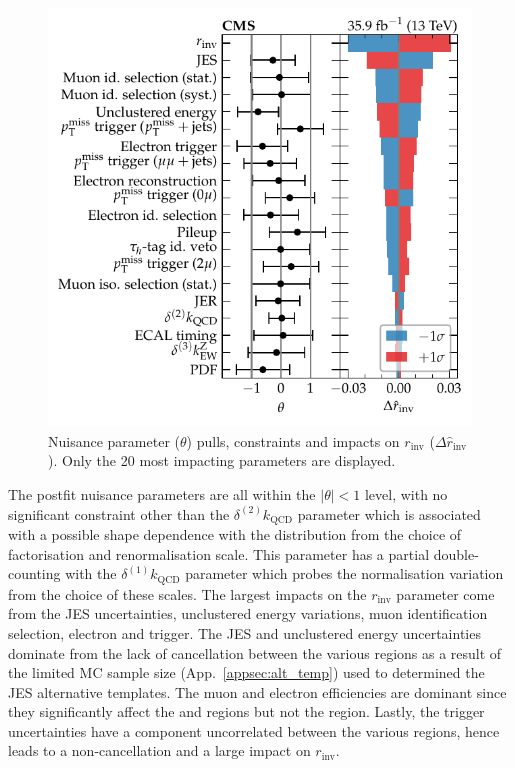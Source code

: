 \begin{figure}
    \centering
    \includegraphics{chapters/043_results/images/finalfit-impacts.pdf}
    \caption[Nuisance parameters after a fit to the data between the signal and control regions.]{
        Nuisance parameter ($\theta$) pulls, constraints and impacts on $r_{\mathrm{inv}}$ ($\Delta \hat{r}_{\mathrm{inv}}$). Only the 20 most impacting parameters are displayed.
    }
    \label{fig:finalfit-impacts}
\end{figure}
%
The postfit nuisance parameters are all within the $|\theta|<1$ level, with no significant constraint other than the $\delta^{(2)}k_{\mathrm{QCD}}$ parameter which is associated with a possible shape dependence with the \recoil distribution from the choice of factorisation and renormalisation scale. This parameter has a partial double-counting with the $\delta^{(1)}k_{\mathrm{QCD}}$ parameter which probes the normalisation variation from the choice of these scales. The largest impacts on the $r_{\mathrm{inv}}$ parameter come from the JES uncertainties, unclustered energy variations, muon identification selection, electron and \ptmiss trigger. The JES and unclustered energy uncertainties dominate from the lack of cancellation between the various regions as a result of the limited MC sample size (App.~\ref{appsec:alt_temp}) used to determined the JES alternative templates. The muon and electron efficiencies are dominant since they significantly affect the \ellplusjets and \diellplusjets regions but not the \metplusjets region. Lastly, the \ptmiss trigger uncertainties have a component uncorrelated between the various regions, hence leads to a non-cancellation and a large impact on $r_{\mathrm{inv}}$.

